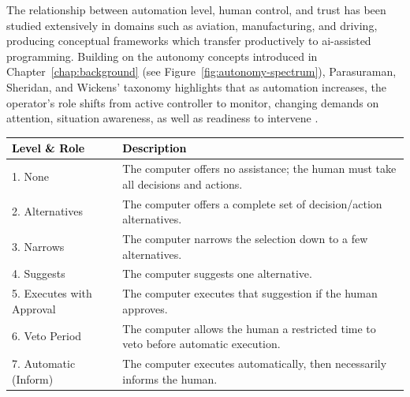 The relationship between automation level, human control, and trust has been studied extensively in domains such as aviation, manufacturing, and driving, producing conceptual frameworks which transfer productively to \gls{ai}-assisted programming. Building on the autonomy concepts introduced in Chapter~\ref{chap:background} (see Figure~\ref{fig:autonomy-spectrum}), Parasuraman, Sheridan, and Wickens’ taxonomy highlights that as automation increases, the operator’s role shifts from active controller to monitor, changing demands on attention, situation awareness, as well as readiness to intervene \parencite[pp.~286--291]{parasuraman2000model}.
\begin{table}[ht]

  \centering

  \small

  \renewcommand{\arraystretch}{1.5}


  \begin{tabularx}{\textwidth}{p{3.5cm} X}

    \toprule

    \rowcolor{accentblue}

    \textcolor{black}{\textbf{Level \& Role}} & \textcolor{black}{\textbf{Description}} \\

    \midrule

    1. None & The computer offers no assistance; the human must take all decisions and actions. \\

    2. Alternatives & The computer offers a complete set of decision/action alternatives. \\

    3. Narrows & The computer narrows the selection down to a few alternatives. \\

    4. Suggests & The computer suggests one alternative. \\

    5. Executes with Approval & The computer executes that suggestion if the human approves. \\

    6. Veto Period & The computer allows the human a restricted time to veto before automatic execution. \\

    7. Automatic (Inform) & The computer executes automatically, then necessarily informs the human. \\


\end{tabularx}
\end{table}
